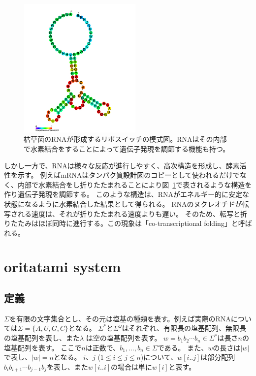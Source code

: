 \documentclass[a4,11pt]{article}
\begin{document}
\begin{figure}[tb]
	\centering
	\includegraphics[width=6cm]{fig/cp/RF00167.jpg}
	\caption{枯草菌のRNAが形成するリボスイッチの模式図。RNAはその内部で水素結合をすることによって遺伝子発現を調節する機能も持つ。}
	\label{fig:riboswitch}
\end{figure}

しかし一方で、RNAは様々な反応が進行しやすく、高次構造を形成し、酵素活性を示す。
例えばmRNAはタンパク質設計図のコピーとして使われるだけでなく、内部で水素結合をし折りたたまれることにより図~\ref{fig:riboswitch}で表されるような構造を作り遺伝子発現を調節する。
このような構造は、RNAがエネルギー的に安定な状態になるように水素結合した結果として得られる。
RNAのヌクレオチドが転写される速度は、それが折りたたまれる速度よりも遅い\cite{encoding}。
そのため、転写と折りたたみはほぼ同時に進行する。この現象は「co-transcriptional folding」と呼ばれる。



\section{oritatami system}


\subsection{定義}
$\Sigma$を有限の文字集合とし、その元は塩基の種類を表す。例えば実際のRNAについては$\Sigma = \{ A,U,G,C \}$となる。
$\Sigma^*$と$\Sigma^\omega$はそれぞれ、有限長の塩基配列、無限長の塩基配列を表し、また$\lambda$ は空の塩基配列を表す。
$w = b_1 b_2 \cdots b_n \in \Sigma^*$は長さ$n$の塩基配列を表す。
ここで$n$は正数で、$b_1, \ldots, b_n \in \Sigma$である。
また、$w$の長さは$|w|$で表し、$|w| = n$となる。
$i$、$j$ ($1 \le i \le j \le n$)について、$w[i..j]$は部分配列$b_i b_{i+1} \cdots b_{j-1} b_j$を表し、また$w[i..i]$の場合は単に$w[i]$と表す。
\end{document}
